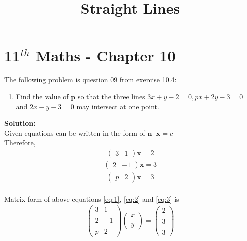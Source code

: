 \documentclass[12pt]{article}
\newcommand{\solution}{\noindent \textbf{Solution: }}
\newcommand{\myvec}[1]{\ensuremath{\begin{pmatrix}#1\end{pmatrix}}}
\let\vec\mathbf
\begin{document}
\graphicspath{{./Documents}{./figs}}
\begin{center}
	\title{\textbf{Straight Lines}}
	\date{\vspace{-5ex}}
	\maketitle
\end{center}
\setcounter{page}{1}
\section*{11$ ^{th} $ Maths - Chapter 10}
The following problem is question 09 from exercise 10.4:
\begin{enumerate}
	\item Find the value of $\vec{p}$ so that the three lines $ 3x + y - 2 = 0, px + 2y - 3 = 0 $ and $ 2x - y - 3 = 0 $ may intersect at one point.
\end{enumerate}
\solution \\
Given equations can be written in the form of $ \vec{n}^{\top}\vec{x} = c$ \\
Therefore, \\ 
\begin{align}
	\myvec{3&1}\vec{x}=2
	\label{eq:1}
\end{align}
\begin{align}
	\myvec{2&-1}\vec{x}=3
	\label{eq:2}
\end{align}
\begin{align}
	\myvec{p&2}\vec{x}=3
	\label{eq:3}
\end{align}\\
Matrix form of above equations \eqref{eq:1}, \eqref{eq:2} and \eqref{eq:3} is
\begin{align}
	\begin{pmatrix}
		3 & 1 \\ \\ 2 & -1 \\ \\ p & 2
	\end{pmatrix}
	\begin{pmatrix}
		x \\ \\ y
	\end{pmatrix}
	=
	\begin{pmatrix}
		2 \\ \\ 3 \\ \\ 3
	\end{pmatrix}
\end{align}
\end{document}
